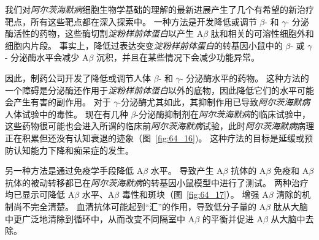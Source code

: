 我们对\textit{阿尔茨海默病}细胞生物学基础的理解的最新进展产生了几个有希望的新治疗靶点，所有这些靶点都在深入探索中。
一种方法是开发降低或调节 $\beta$- 和 $\gamma$- 分泌酶活性的药物，这些酶切割\textit{淀粉样前体蛋白}以产生 A$\beta$ 肽和相关的可溶性细胞外和细胞内片段。
事实上，降低过表达突变\textit{淀粉样前体蛋白}的转基因小鼠中的 $\beta$- 或 $\gamma$- 分泌酶水平会减少 A$\beta$ 沉积，并且在某些情况下会减少功能异常。


因此，制药公司开发了降低或调节人体 $\beta$- 和 $\gamma$- 分泌酶水平的药物。
这种方法的一个障碍是分泌酶还作用于\textit{淀粉样前体蛋白}以外的底物，因此降低它们的水平可能会产生有害的副作用。
对于 $\gamma$-分泌酶尤其如此，其抑制作用已导致\textit{阿尔茨海默病}人体试验中的毒性。
现在有几种 $\beta$-分泌酶抑制剂在\textit{阿尔茨海默病}的临床试验中，这些药物很可能也会进入所谓的临床前\textit{阿尔茨海默病}试验，此时\textit{阿尔茨海默病}病理正在积累但还没有认知衰退的迹象（图~\ref{fig:64_16})。
这种疗法的目标是延缓或预防认知能力下降和痴呆症的发生。


另一种方法是通过免疫学手段降低 A$\beta$ 水平。
导致产生 A$\beta$ 抗体的 A$\beta$ 免疫和 A$\beta$ 抗体的被动转移都已在\textit{阿尔茨海默病}的转基因小鼠模型中进行了测试。
两种治疗均已显示可降低 A$\beta$ 水平、A$\beta$ 毒性和斑块（图~\ref{fig:64_17}）。
增强 A$\beta$ 清除的机制尚不完全清楚。
血清抗体可能起到“汇”的作用，导致低分子量的 A$\beta$ 肽从大脑中更广泛地清除到循环中，从而改变不同隔室中 A$\beta$ 的平衡并促进 A$\beta$ 从大脑中去除。



